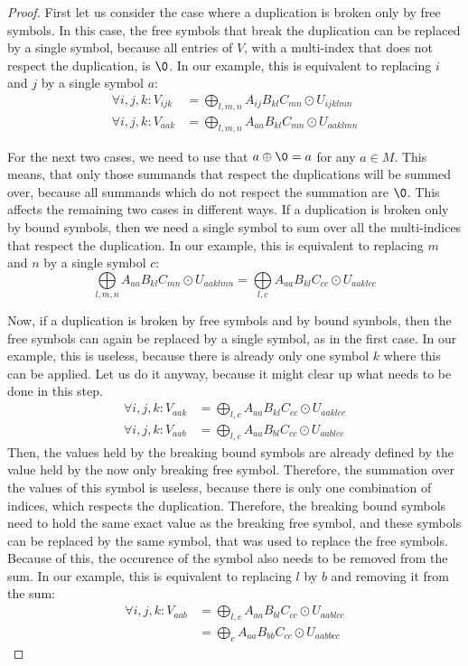 \begin{proof}
    First let us consider the case where a duplication is broken only by free symbols.
    In this case, the free symbols that break the duplication can be replaced by a single symbol,
    because all entries of $V$, with a multi-index that does not respect the duplication, is $\0$.
    In our example, this is equivalent to replacing $i$ and $j$ by a single symbol $a$:
    \begin{align*}
        \forall i,j,k: V_{ijk} & = \bigoplus\limits_{l,m,n} A_{ij} B_{kl} C_{mn} \odot U_{ijklmn} \\
        \forall i,j,k: V_{aak} & = \bigoplus\limits_{l,m,n} A_{aa} B_{kl} C_{mn} \odot U_{aaklmn}
    \end{align*}

    For the next two cases, we need to use that $a \oplus \0 = a$ for any $a \in M$.
    This means, that only those summands that respect the duplications will be summed over,
    because all summands which do not respect the summation are $\0$.
    This affects the remaining two cases in different ways.
    If a duplication is broken only by bound symbols, then we need a single symbol to sum over all the multi-indices that respect the duplication.
    In our example, this is equivalent to replacing $m$ and $n$ by a single symbol $c$:
    $$\bigoplus\limits_{l,m,n} A_{aa} B_{kl} C_{mn} \odot U_{aaklmn} = \bigoplus\limits_{l,c} A_{aa} B_{kl} C_{cc} \odot U_{aaklcc}$$

    Now, if a duplication is broken by free symbols and by bound symbols,
    then the free symbols can again be replaced by a single symbol, as in the first case.
    In our example, this is useless, because there is already only one symbol $k$ where this can be applied.
    Let us do it anyway, because it might clear up what needs to be done in this step.
    \begin{align*}
        \forall i,j,k: V_{aak} & = \bigoplus\limits_{l,c} A_{aa} B_{kl} C_{cc} \odot U_{aaklcc} \\
        \forall i,j,k: V_{aab} & = \bigoplus\limits_{l,c} A_{aa} B_{bl} C_{cc} \odot U_{aablcc}
    \end{align*}
    Then, the values held by the breaking bound symbols are already defined by the value held by the now only breaking free symbol.
    Therefore, the summation over the values of this symbol is useless, because there is only one combination of indices, which respects the duplication.
    Therefore, the breaking bound symbols need to hold the same exact value as the breaking free symbol,
    and these symbols can be replaced by the same symbol, that was used to replace the free symbols.
    Because of this, the occurence of the symbol also needs to be removed from the sum.
    In our example, this is equivalent to replacing $l$ by $b$ and removing it from the sum:
    \begin{align*}
        \forall i,j,k: V_{aab} & = \bigoplus\limits_{l,c} A_{aa} B_{bl} C_{cc} \odot U_{aablcc} \\
                               & = \bigoplus\limits_{c} A_{aa} B_{bb} C_{cc} \odot U_{aabbcc}
    \end{align*}


\end{proof}
